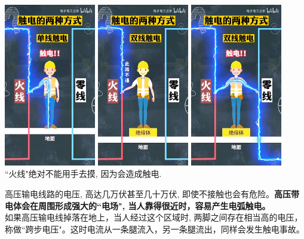 \documentclass[UTF8]{ctexart}
\begin{document}
	\includegraphics[width=0.3\textwidth]{img/0076.png} 
	\includegraphics[width=0.3\textwidth]{img/0077.png} 
	\includegraphics[width=0.3\textwidth]{img/0078.png}  \\
	
``火线"绝对不能用手去摸, 因为会造成触电. 

高压输电线路的电压, 高达几万伏甚至几十万伏, 即使不接触也会有危险。\textbf{高压带电体会在周围形成强大的``电场", 当人靠得很近时，容易产生电弧触电。} \\
如果高压输电线掉落在地上，当人经过这个区域时, 两脚之间存在相当高的电压，称做``跨步电压"。这时电流从一条腿流入，另一条腿流出，同样会发生触电事故。 \\
\end{document}
